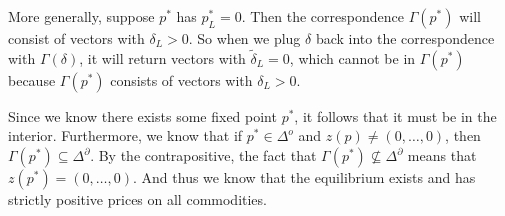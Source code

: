 \documentclass[12pt]{article}
\theoremstyle{definition}
\begin{document}
More generally, suppose $p^*$ has $p_L^*=0$. Then the correspondence  $\Gamma(p^*)$ will consist of vectors with $\delta_L > 0$. So when we plug $\delta$ back into the correspondence with  $\Gamma(\delta)$, it will return vectors with $\tilde{\delta}_L=0$, which cannot be in $\Gamma(p^*)$ because  $\Gamma(p^*)$ consists of vectors with $\delta_L>0$. 

Since we know there exists some fixed point $p^*$, it follows that it must be in the interior. Furthermore, we know that if $p^* \in \Delta^o$ and $z(p) \neq (0, \hdots, 0)$, then $\Gamma(p^*) \subseteq \Delta^{\partial}$. By the contrapositive, the fact that $\Gamma(p^*) \not\subseteq \Delta^{\partial}$ means that $z(p^*)=(0, \hdots, 0)$. And thus we know that the equilibrium exists and has strictly positive prices on all commodities. 
\end{document}
